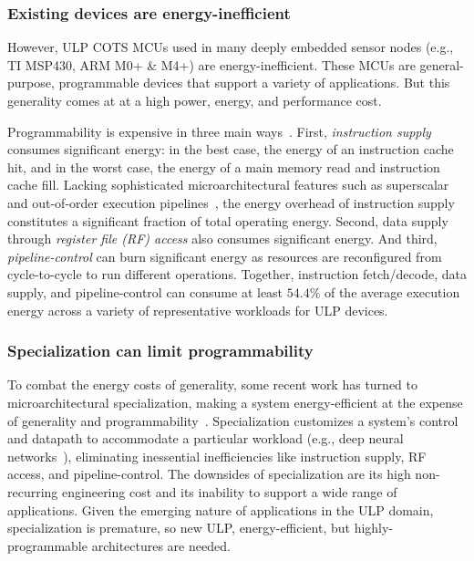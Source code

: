 \subsubsection{Existing devices are energy-inefficient}
However, ULP COTS MCUs used in many deeply embedded sensor nodes
(e.g., TI MSP430, ARM M0+ \& M4+) are energy-inefficient.
%
These MCUs are general-purpose, programmable devices that support a variety of
applications.
% 
But this generality comes at at a high power, energy, and performance cost.

Programmability is expensive in three main ways~\cite{horowitz:isscc14:energy-keynote,hameed2010understanding,balfour_elm_thesis}.
First, \emph{instruction supply} consumes significant energy: in the best case, the energy of
an instruction cache hit, and in the worst case, the energy of a main memory
read and instruction cache fill.  
%
Lacking sophisticated microarchitectural features such as superscalar and
out-of-order execution pipelines~\cite{msp430fr5994,traber2016pulpino}, the energy overhead of
instruction supply constitutes a significant fraction of total operating energy.
%
Second, data supply through \emph{register file (RF) access} also consumes significant energy.
% 
And third, \emph{pipeline-control} can burn significant energy as resources are reconfigured from cycle-to-cycle to run different operations.
%
Together, instruction fetch/decode, data supply, and pipeline-control can consume at least $54.4\%$ of the average execution energy across a variety of representative workloads for ULP devices.

\subsubsection{Specialization can limit programmability}
To combat the energy costs of generality, some recent work has turned to
microarchitectural specialization, making a system energy-efficient at the
expense of generality and
programmability~\cite{chen:isca16:eyeriss,chen:asplos14:diannao,du:isca15:shidiannao,liu:isca15:pudiannao,chen2014dadiannao,venkatesh2010conservation}.
% 
Specialization customizes a system's control and datapath to accommodate a
particular workload (e.g., deep neural networks~\cite{chen:isca16:eyeriss,chen:asplos14:diannao}),
eliminating inessential inefficiencies like instruction supply, RF access, and pipeline-control.
% 
The downsides of specialization are its high non-recurring engineering cost and its inability to support a wide range of applications.
% 
Given the emerging nature of applications in the ULP domain, specialization is premature, so new ULP, energy-efficient, but highly-programmable architectures are needed.

